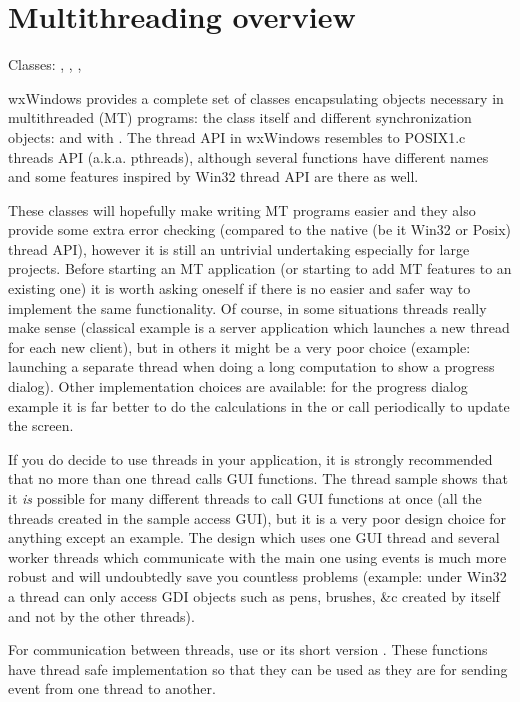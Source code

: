\section{Multithreading overview}\label{wxthreadoverview}

Classes: , , 
, 

wxWindows provides a complete set of classes encapsulating objects necessary in
multithreaded (MT) programs: the  class itself and different
synchronization objects:  and 
 with 
. The thread API in wxWindows resembles to
POSIX1.c threads API (a.k.a. pthreads), although several functions have
different names and some features inspired by Win32 thread API are there as
well.

These classes will hopefully make writing MT programs easier and they also
provide some extra error checking (compared to the native (be it Win32 or Posix)
thread API), however it is still an untrivial undertaking especially for large
projects. Before starting an MT application (or starting to add MT features to
an existing one) it is worth asking oneself if there is no easier and safer way
to implement the same functionality. Of course, in some situations threads
really make sense (classical example is a server application which launches a
new thread for each new client), but in others it might be a very poor choice
(example: launching a separate thread when doing a long computation to show a
progress dialog). Other implementation choices are available: for the progress
dialog example it is far better to do the calculations in the 
 or call  
periodically to update the screen.

If you do decide to use threads in your application, it is strongly recommended
that no more than one thread calls GUI functions. The thread sample shows that
it {\it is} possible for many different threads to call GUI functions at once
(all the threads created in the sample access GUI), but it is a very poor design
choice for anything except an example. The design which uses one GUI thread and
several worker threads which communicate with the main one using events is much
more robust and will undoubtedly save you countless problems (example: under
Win32 a thread can only access GDI objects such as pens, brushes, \&c created by
itself and not by the other threads).

For communication between threads, use 
or its short version . These functions
have thread safe implementation so that they can be used as they are for
sending event from one thread to another.


